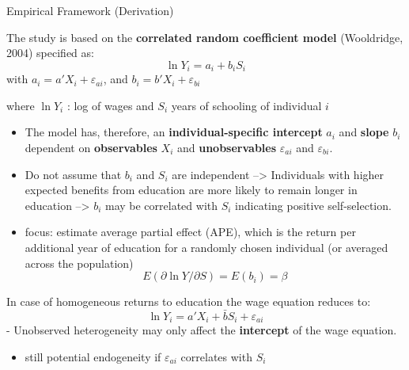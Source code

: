 \documentclass[10pt,ignorenonframetext,]{beamer}
\providecommand{\tightlist}{%
  \setlength{\itemsep}{0pt}\setlength{\parskip}{0pt}}
\begin{document}
\begin{frame}[allowframebreaks]{Empirical Framework (Derivation)}
\protect\hypertarget{empirical-framework-derivation}{}

The study is based on the \textbf{correlated random coefficient model}
(Wooldridge, 2004) specified as: \[\ln Y_i = a_i + b_i S_i\] with
\(a_i = a'X_i + \varepsilon_{ai}\), and
\(b_i = b'X_i + \varepsilon_{bi}\)

where \(\ln Y_i\) : log of wages and \(S_i\) years of schooling of
individual \(i\)

\begin{itemize}
\item
  The model has, therefore, an \textbf{individual-specific intercept}
  \(a_i\) and \textbf{slope} \(b_i\) dependent on \textbf{observables}
  \(X_i\) and \textbf{unobservables} \(\varepsilon_{ai}\) and
  \(\varepsilon_{bi}\).
\item
  Do not assume that \(b_i\) and \(S_i\) are independent
  --\textgreater{} Individuals with higher expected benefits from
  education are more likely to remain longer in education
  --\textgreater{} \(b_i\) may be correlated with \(S_i\) indicating
  positive self-selection.
\item
  focus: estimate average partial effect (APE), which is the return per
  additional year of education for a randomly chosen individual (or
  averaged across the population)
  \[E(\partial \ln Y / \partial S) = E(b_i) = \beta\]
\end{itemize}

In case of homogeneous returns to education the wage equation reduces
to: \[\ln Y_i = a'X_i + \bar b S_i + \varepsilon_{ai}\] - Unobserved
heterogeneity may only affect the \textbf{intercept} of the wage
equation.

\begin{itemize}
\tightlist
\item
  still potential endogeneity if \(\varepsilon_{ai}\) correlates with
  \(S_i\)
\end{itemize}

\end{frame}
\end{document}
